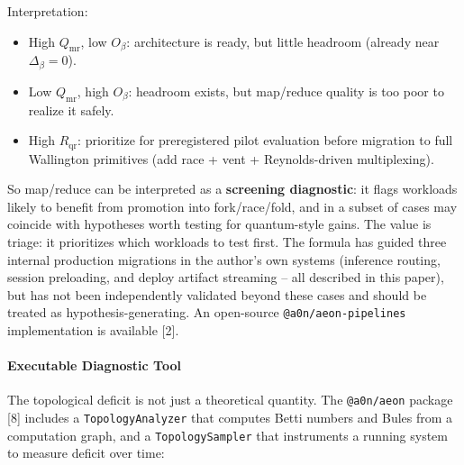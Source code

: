 \documentclass[
  11pt,
]{article}
\begin{document}
Interpretation:

\begin{itemize}
\item
  High \(Q_{\text{mr}}\), low \(O_{\beta}\): architecture is ready, but
  little headroom (already near \(\Delta_\beta = 0\)).
\item
  Low \(Q_{\text{mr}}\), high \(O_{\beta}\): headroom exists, but
  map/reduce quality is too poor to realize it safely.
\item
  High \(R_{\text{qr}}\): prioritize for preregistered pilot evaluation
  before migration to full Wallington primitives (add race + vent +
  Reynolds-driven multiplexing).
\end{itemize}

So map/reduce can be interpreted as a \textbf{screening diagnostic}: it
flags workloads likely to benefit from promotion into fork/race/fold,
and in a subset of cases may coincide with hypotheses worth testing for
quantum-style gains. The value is triage: it prioritizes which workloads
to test first. The formula has guided three internal production
migrations in the author's own systems (inference routing, session
preloading, and deploy artifact streaming -- all described in this
paper), but has not been independently validated beyond these cases and
should be treated as hypothesis-generating. An open-source
\texttt{@a0n/aeon-pipelines} implementation is available
{[}2{]}.

\paragraph{Executable Diagnostic Tool}\label{executable-diagnostic-tool}

The topological deficit is not just a theoretical quantity. The
\texttt{@a0n/aeon} package {[}8{]} includes a
\texttt{TopologyAnalyzer} that computes Betti numbers and Bules from a
computation graph, and a \texttt{TopologySampler} that instruments a
running system to measure deficit over time:
\end{document}
